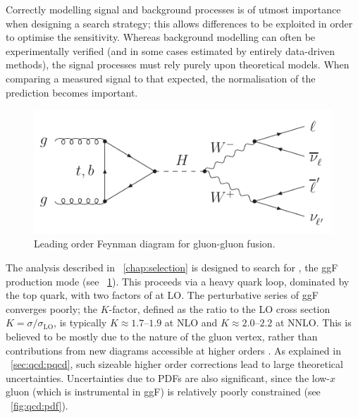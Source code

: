 
Correctly modelling signal and background processes is of utmost importance when designing 
a search strategy; this allows differences to be exploited in order to optimise the 
sensitivity. Whereas background modelling can often be experimentally verified (and in 
some cases estimated by entirely data-driven methods), the signal processes must rely 
purely upon theoretical models. When comparing a measured signal to that expected, the 
normalisation of the prediction becomes important.

\begin{figure}[b]
	\includegraphics[width=\mediumfigwidth]{axodraw/ggf_WWlvlv.pdf}
	\caption{Leading order Feynman diagram for gluon-gluon fusion.}
	\label{fig:sig:ggF}
\end{figure}

The analysis described in \Chapter~\ref{chap:selection} is designed to search for 
\ggHWWlvlv, \ie the \ac{ggF} production mode (see \Figure~\ref{fig:sig:ggF}). This 
proceeds via a heavy quark loop, dominated by the top quark, with two factors of \alphaS 
at \ac{LO}. The perturbative series of \ac{ggF} converges poorly; the $K$-factor, defined 
as the ratio to the \ac{LO} cross section $K = \sigma / \sigma_{\text{LO}}$, is typically 
$K \approx 1.7\text{--}1.9$ at \ac{NLO} and $K \approx 2.0\text{--}2.2$ at \ac{NNLO}.
This is believed to be mostly due to the nature of the gluon vertex, rather than 
contributions from new diagrams accessible at higher orders \cite{Becher:2009}. As 
explained in \Section~\ref{sec:qcd:pqcd}, such sizeable higher order corrections lead 
to large theoretical uncertainties. Uncertainties due to \acp{PDF} are also significant, 
since the low-$x$ gluon (which is instrumental in \ac{ggF}) is relatively poorly 
constrained (see \Figure~\ref{fig:qcd:pdf}).

